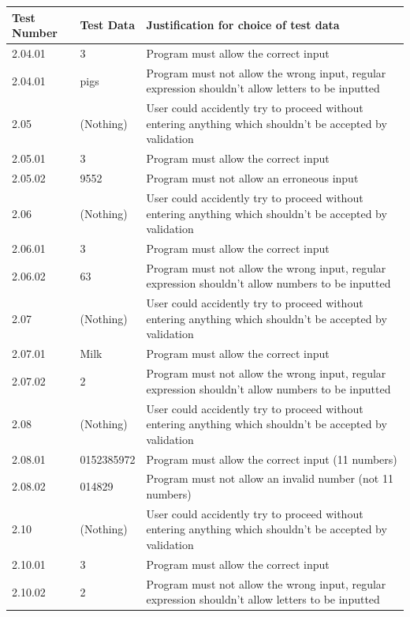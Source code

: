 \begin{center}
    \begin{tabular}{|p{2cm}|p{3cm}|p{7cm}|}
        \hline
        \textbf{Test Number} & \textbf{Test Data} & \textbf{Justification for choice of test data}\\ \hline

	2.04.01 & 3 & Program must allow the correct input \\ \hline
	2.04.01 & pigs & Program must not  allow the wrong input, regular expression shouldn't allow letters to be inputted \\ \hline
	2.05 & (Nothing) &User could accidently try to proceed without entering anything which shouldn't be accepted by validation \\ \hline
	2.05.01 & 3 & Program must allow the correct input \\ \hline
	2.05.02 & 9552 & Program must not allow an erroneous input \\ \hline
	2.06 & (Nothing) &User could accidently try to proceed without entering anything which shouldn't be accepted by validation \\ \hline
	2.06.01 & 3 & Program must allow the correct input \\ \hline
	2.06.02 & 63 & Program must not  allow the wrong input, regular expression shouldn't allow numbers to be inputted \\ \hline
	2.07 & (Nothing) & User could accidently try to proceed without entering anything which shouldn't be accepted by validation \\ \hline
	2.07.01 & Milk & Program must allow the correct input \\ \hline
	2.07.02 & 2 & Program must not  allow the wrong input, regular expression shouldn't allow numbers to be inputted \\ \hline
	2.08 & (Nothing) &User could accidently try to proceed without entering anything which shouldn't be accepted by validation\\ \hline
	2.08.01 & 0152385972 & Program must allow the correct input (11 numbers) \\ \hline
	2.08.02 & 014829 & Program must not allow an invalid number (not 11 numbers) \\ \hline
	2.10 & (Nothing) & User could accidently try to proceed without entering anything which shouldn't be accepted by validation \\ \hline
	2.10.01 & 3 & Program must allow the correct input \\ \hline
	2.10.02 & 2 & Program must not allow the wrong input, regular expression shouldn't allow letters to be inputted \\ \hline


	

    \end{tabular}
\end{center}


